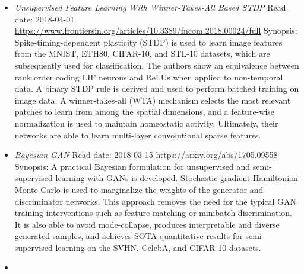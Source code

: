 \documentclass{article}%
\begin{document}
\begin{itemize}
\textit{Spiking allows neurons to estimate their causal effect}%
\newline%
Read date: 2018{-}04{-}01%
\newline%
\href{https://www.biorxiv.org/content/early/2018/01/25/253351}{https://www.biorxiv.org/content/early/2018/01/25/253351}%
\newline%
Synopsis: Regression discontinuity design (a popular causal technique from economics) is used in a new synaptic learning rule such that neurons may estimate their causal effect on task performance.%
\item%
\textit{Unsupervised Feature Learning With Winner{-}Takes{-}All Based STDP}%
\newline%
Read date: 2018{-}04{-}01%
\newline%
\href{https://www.frontiersin.org/articles/10.3389/fncom.2018.00024/full}{https://www.frontiersin.org/articles/10.3389/fncom.2018.00024/full}%
\newline%
Synopsis: Spike{-}timing{-}dependent plasticity (STDP) is used to learn image features from the MNIST, ETH80, CIFAR{-}10, and STL{-}10 datasets, which are subsequently used for classification. The authors show an equivalence between rank order coding LIF neurons and ReLUs when applied to non{-}temporal data. A binary STDP rule is derived and used to perform batched training on image data. A winner{-}takes{-}all (WTA) mechanism selects the most relevant patches to learn from among the spatial dimensions, and a feature{-}wise normalization is used to maintain homeostatic activity. Ultimately, their networks are able to learn multi{-}layer convolutional sparse features.%
\item%
\textit{Bayesian GAN}%
\newline%
Read date: 2018{-}03{-}15%
\newline%
\href{https://arxiv.org/abs/1705.09558}{https://arxiv.org/abs/1705.09558}%
\newline%
Synopsis: A practical Bayesian formulation for unsupervised and semi{-}supervised learning with GANs is developed. Stochastic gradient Hamiltonian Monte Carlo is used to marginalize the weights of the generator and discriminator networks. This approach removes the need for the typical GAN training interventions such as feature matching or minibatch discrimination. It is also able to avoid mode{-}collapse, produces interpretable and diverse generated samples, and achieves SOTA quantitative results for semi{-}supervised learning on the SVHN, CelebA, and CIFAR{-}10 datasets.%
\item%

\end{itemize}
\end{document}

